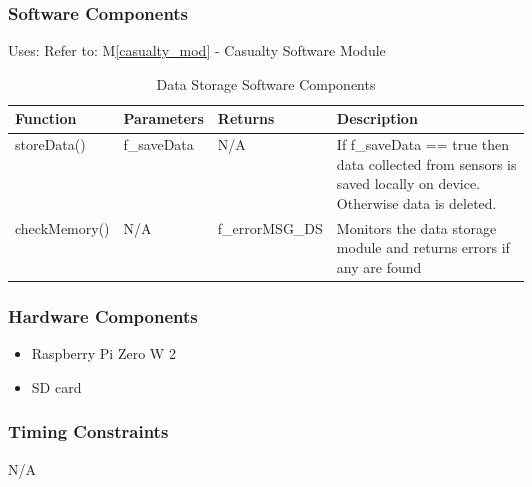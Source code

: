 \documentclass{article}
\begin{document}
\begin{description}
        \subsubsection{Software Components}
            \noindent
            Uses: Refer to: M\ref{casualty_mod} - Casualty Software Module
                \begin{longtable}{|l|l|p{0.2\linewidth}|p{0.4\linewidth}|}
                \caption{Data Storage Software Components}
                \hline
                \textbf{Function} & \textbf{Parameters} & \textbf {Returns} & \textbf{Description} \\
                \endhead
                \hline
                storeData() & f\_saveData & N/A
                & If f\_saveData == true then data collected from sensors is saved locally on device. Otherwise data is deleted.  \\
                \hline
                checkMemory() & N/A & f\_errorMSG\_DS & Monitors the data storage module and returns errors if any are found \\
                \hline
                \end{longtable}
        \subsubsection{Hardware Components}
            \begin{itemize}
            \item Raspberry Pi Zero W 2
            \item SD card
            \end{itemize}
        \subsubsection{Timing Constraints}
        N/A
    \newpage


\end{description}
\end{document}
